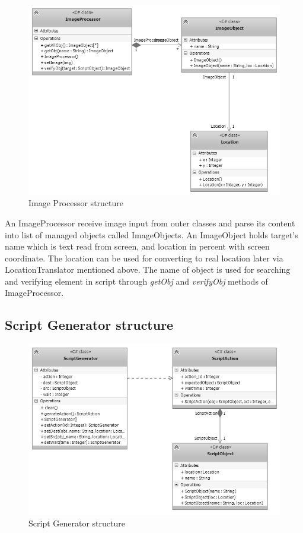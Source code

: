 	\begin{figure}[H]
		\centering
		\includegraphics[scale=0.75]{Chapters/Fig/img_processor.png}
		\caption{Image Processor structure}
		\label{fig:img_processor}
	\end{figure}

An ImageProcessor receive image input from outer classes and parse its content into list of managed objects called ImageObjects. An ImageObject holds target's name which is text read from screen, and location in percent with screen coordinate. The location can be used for converting to real location later via LocationTranslator mentioned above. The name of object is used for searching and verifying element in script through \textit{getObj} and \textit{verifyObj} methods of ImageProcessor.

\subsection{Script Generator structure}

	\begin{figure}[H]
		\centering
		\includegraphics[scale=0.75]{Chapters/Fig/script_gen.png}
		\caption{Script Generator structure}
		\label{fig:script_gen}
	\end{figure}

